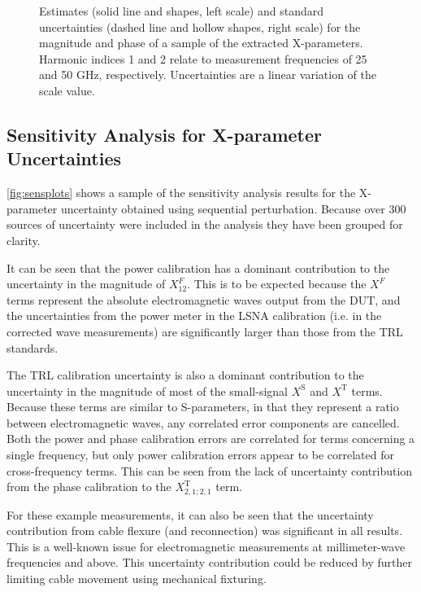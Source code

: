 \documentclass[../thesis/thesis.tex]{subfiles}
\begin{document}
\begin{refsection}
\begin{figure}
\begin{subfigure}{0.45\textwidth}
		\label{ch5_fig_t212kp}
	\end{subfigure}
	\caption[Estimates and standard uncertainties for the magnitude and phase of a sample of the extracted X-parameters.]{Estimates (solid line and shapes, left scale) and standard uncertainties (dashed line and hollow shapes, right scale) for the magnitude and phase of a sample of the extracted X-parameters. Harmonic indices 1 and 2 relate to measurement frequencies of 25 and 50 GHz, respectively. Uncertainties are a linear variation of the scale value.}
	\label{ch5_fig_summaryplots}
\end{figure}

\subsection{Sensitivity Analysis for X-parameter Uncertainties}

\figurename{ \ref{fig:sensplots}} shows a sample of the sensitivity analysis results for the X-parameter uncertainty obtained using sequential perturbation. Because over 300 sources of uncertainty were included in the analysis they have been grouped for clarity.

It can be seen that the power calibration has a dominant contribution to the uncertainty in the magnitude of $X^F_{12}$. This is to be expected because the $X^F$ terms represent the absolute electromagnetic waves output from the DUT, and the uncertainties from the power meter in the LSNA calibration (i.e. in the corrected wave measurements) are significantly larger than those from the TRL standards.

The TRL calibration uncertainty is also a dominant contribution to the uncertainty in the magnitude of most of the small-signal $X^\textrm{S}$ and $X^\textrm{T}$ terms. Because these terms are similar to S-parameters, in that they represent a ratio between electromagnetic waves, any correlated error components are cancelled. Both the power and phase calibration errors are correlated for terms concerning a single frequency, but only power calibration errors appear to be correlated for cross-frequency terms. This can be seen from the lack of uncertainty contribution from the phase calibration to the $X^\textrm{T}_{2,1;2,1}$ term.

For these example measurements, it can also be seen that the uncertainty contribution from cable flexure (and reconnection) was significant in all results. This is a well-known issue for electromagnetic measurements at millimeter-wave frequencies and above. This uncertainty contribution could be reduced by further limiting cable movement using mechanical fixturing.


\end{refsection}
\end{document}
